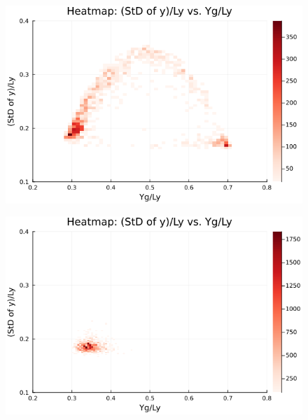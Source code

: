 \begin{figure}[H]
  \centering
  \includegraphics[scale=0.6]{image/RaRtmap10_heat/2023-12-28T12:38:52.236_map_10times_chi1.265_Ay50_rho0.4_T0.43_dT0.04_Rd0.0_Rt0.25_Ra1.877538_g0.0003999718779659611_run4.0e8.png}
  \label{}
\end{figure}

\begin{figure}[H]
  \centering
  \includegraphics[scale=0.6]{image/RaRtmap10_heat/2023-12-28T12:38:52.311_map_10times_chi1.265_Ay50_rho0.4_T0.43_dT0.04_Rd0.0_Rt0.375_Ra0.0_g0.0003999718779659611_run4.0e8.png}
  \label{}
\end{figure}

